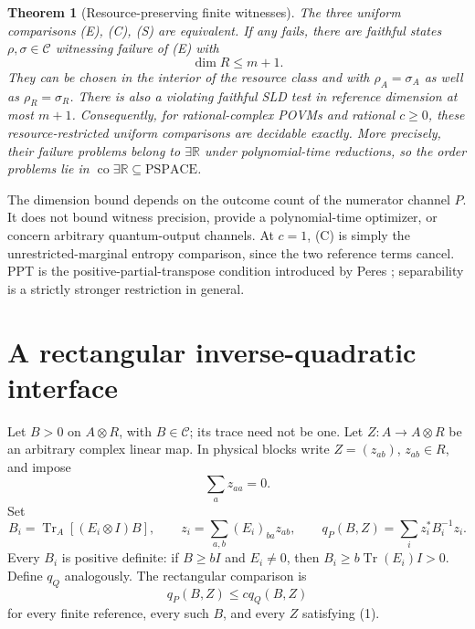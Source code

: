 \documentclass[11pt]{article}
\newtheorem{theorem}{Theorem}
\newcommand{\Tr}{\operatorname{Tr}}
\begin{document}
\begin{theorem}[Resource-preserving finite witnesses]\label{thm:main}
The three uniform comparisons (E), (C), (S) are equivalent. If any fails,
there are faithful states $\rho,\sigma\in\mathcal C$ witnessing failure of
(E) with
\[
                   \dim R\leq m+1.
\]
They can be chosen in the interior of the resource class and with
$\rho_A=\sigma_A$ as well as $\rho_R=\sigma_R$.
There is also a violating faithful SLD test in reference dimension at most
$m+1$. Consequently, for rational-complex POVMs and rational $c\geq0$,
these resource-restricted uniform comparisons are decidable exactly.
More precisely, their failure problems belong to $\exists\mathbb R$ under
polynomial-time reductions, so the order problems lie in
$\operatorname{co}\exists\mathbb R\subseteq\mathrm{PSPACE}$.
\end{theorem}

The dimension bound depends on the outcome count of the numerator channel
$P$. It does not bound witness precision, provide a polynomial-time optimizer,
or concern arbitrary quantum-output channels. At $c=1$, (C) is simply the
unrestricted-marginal entropy comparison, since the two reference terms cancel.
PPT is the positive-partial-transpose condition introduced by Peres
\cite{peres}; separability is a strictly stronger restriction in general.

\section{A rectangular inverse-quadratic interface}
Let $B>0$ on $A\otimes R$, with $B\in\mathcal C$; its trace need not be one.
Let $Z:A\longrightarrow A\otimes R$ be an arbitrary complex linear map.
In physical blocks write $Z=(z_{ab})$, $z_{ab}\in R$, and impose
\[
                         \sum_a z_{aa}=0.                       \label{eq:ztrace}\tag{1}
\]
Set
\[
 B_i=\Tr_A[(E_i\otimes I)B],\qquad
 z_i=\sum_{a,b}(E_i)_{ba}z_{ab},\qquad
 q_P(B,Z)=\sum_i z_i^*B_i^{-1}z_i.                              \tag{2}
\]
Every $B_i$ is positive definite: if $B\geq bI$ and $E_i\neq0$, then
$B_i\geq b\Tr(E_i)I>0$. Define $q_Q$ analogously. The rectangular comparison is
\[
                 q_P(B,Z)\leq c q_Q(B,Z)                       \tag{R}\label{eq:R}
\]
for every finite reference, every such $B$, and every $Z$ satisfying (1).
\end{document}
